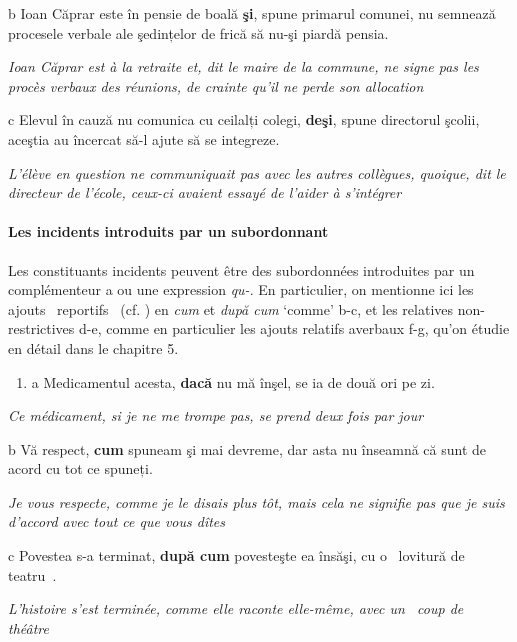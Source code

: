   b  Ioan Căprar este în pensie de boală \textbf{şi}, spune primarul comunei, nu semnează procesele verbale ale şedințelor de frică să nu-şi piardă pensia.

{\itshape
Ioan Căprar est à la retraite et, dit le maire de la commune, ne signe pas les procès verbaux des réunions, de crainte qu'il ne perde son allocation}

  c  Elevul în cauză nu comunica cu ceilalți colegi, \textbf{deşi}, spune directorul şcolii, aceştia au încercat să-l ajute să se integreze.

    \textit{L'élève en question ne communiquait pas avec les autres collègues, quoique, dit le directeur de l'école, ceux-ci avaient essayé de l'aider à s'intégrer   } 

\paragraph[Les incidents introduits par un subordonnant]{Les incidents introduits par un subordonnant}
Les constituants incidents peuvent être des subordonnées introduites par un complémenteur a ou une expression \textit{qu-}. En particulier, on mentionne ici les ajouts {\guillemotleft}~reportifs~{\guillemotright} (cf. \citet{Desmets2001}) en \textit{cum} et \textit{după cum} `comme' b-c, et les relatives non-restrictives d-e, comme en particulier les ajouts relatifs averbaux f-g, qu'on étudie en détail dans le chapitre 5.  


\begin{enumerate}
\item \label{bkm:Ref275532759}a  Medicamentul acesta, \textbf{dacă} nu mă înşel, se ia de două ori pe zi.


\end{enumerate}
{\itshape
Ce médicament, si je ne me trompe pas, se prend deux fois par jour}

  b  Vă respect, \textbf{cum} spuneam şi mai devreme, dar asta nu înseamnă că sunt de acord cu tot ce spuneți.

{\itshape
Je vous respecte, comme je le disais plus tôt, mais cela ne signifie pas que je suis d'accord avec tout ce que vous dîtes}

  c  Povestea s-a terminat, \textbf{după cum} povesteşte ea însăşi, cu o {\guillemotleft}~lovitură de teatru~{\guillemotright}.

{\itshape
L'histoire s'est terminée, comme elle raconte elle-même, avec un {\guillemotleft}~coup de théâtre~{\guillemotright}}

